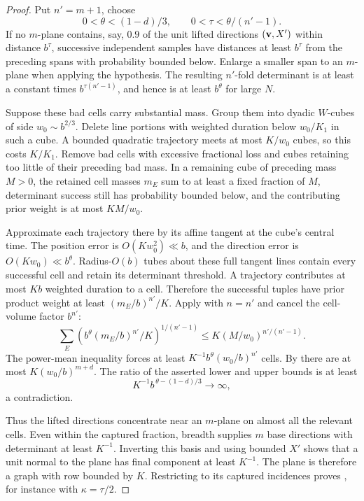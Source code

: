 \begin{proof}
Put \(n'=m+1\), choose
\[
 0<\theta<(1-d)/3,\qquad 0<\tau<\theta/(n'-1).
\]
If no \(m\)-plane contains, say, \(0.9\) of the unit lifted directions
\(({\bf v},X')\) within distance \(b^\tau\), successive independent
samples have distances at least \(b^\tau\) from the preceding spans
with probability bounded below. Enlarge a smaller span to an
\(m\)-plane when applying the hypothesis. The resulting
\(n'\)-fold determinant is at least a constant times
\(b^{\tau(n'-1)}\), and hence is at least \(b^\theta\) for large \(N\).

Suppose these bad cells carry substantial mass. Group them into
dyadic \(W\)-cubes of side \(w_0\sim b^{2/3}\). Delete line portions
with weighted duration below \(w_0/K_1\) in such a cube. A bounded
quadratic trajectory meets at most \(K/w_0\) cubes, so this costs
\(K/K_1\). Remove bad cells with excessive fractional loss and
cubes retaining too little of their preceding bad mass.
In a remaining cube of preceding mass \(M>0\), the retained cell
masses \(m_E\) sum to at least a fixed fraction of \(M\), determinant
success still has probability bounded below, and the contributing
prior weight is at most \(KM/w_0\).

Approximate each trajectory there by its affine tangent at the cube's
central time. The position error is \(O(Kw_0^2)\ll b\), and the
direction error is \(O(Kw_0)\ll b^\theta\).
Radius-\(O(b)\) tubes about these full tangent lines contain every
successful cell and retain its determinant threshold.
A trajectory contributes at most \(Kb\) weighted duration to a
cell. Therefore the successful tuples have prior product weight
at least \((m_E/b)^{n'}/K\).
Apply  with \(n=n'\) and cancel the
cell-volume factor \(b^{n'}\):
\[
 \sum_E\left(
 b^\theta(m_E/b)^{n'}/K
 \right)^{1/(n'-1)}
 \leq K(M/w_0)^{n'/(n'-1)}.
\]
The power-mean inequality forces at least
\(K^{-1}b^\theta(w_0/b)^{n'}\) cells.
By  there are at most
\(K(w_0/b)^{m+d}\). The ratio of the asserted lower and upper
bounds is at least
\[
 K^{-1}b^{\,\theta-(1-d)/3}\longrightarrow\infty,
\]
a contradiction.

Thus the lifted directions concentrate near an \(m\)-plane on
almost all the relevant cells. Even within the captured fraction,
breadth supplies \(m\) base directions with determinant at least
\(K^{-1}\). Inverting this basis and using bounded \(X'\) shows that
a unit normal to the plane has final component at least \(K^{-1}\).
The plane is therefore a graph with row bounded by \(K\).
Restricting to its captured incidences proves
, for instance with \(\kappa=\tau/2\).


\end{proof}
